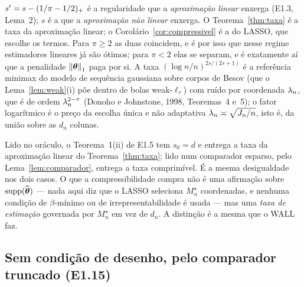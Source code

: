 \documentclass[11pt,a4paper]{article}
\newcommand{\Mstar}{M^{\star}}
\begin{document}
\begin{remark}\label{rem:tres}
$s' = s - (1/\pi - 1/2)_{+}$ é a regularidade que a \emph{aproximação
linear} enxerga (E1.3, Lema~2); $s$ é a que a \emph{aproximação não linear}
enxerga. O Teorema~\ref{thm:taxa} é a taxa da aproximação linear; o
Corolário~\ref{cor:compressivel} é a do LASSO, que escolhe os termos. Para $\pi \ge 2$ as duas coincidem, e é
por isso que nesse regime estimadores lineares já são ótimos; para $\pi < 2$
elas se separam, e é exatamente aí que a penalidade $\left\lVert \boldsymbol{\theta} \right\rVert_{1}$ paga
por si. A taxa $(\log n/n)^{2s/(2s+1)}$ é a referência minimax do modelo de
sequência gaussiana sobre corpos de Besov (que o Lema~\ref{lem:weak}(i) põe
dentro de bolas weak-$\ell_{\tau}$) com ruído por coordenada $\lambda_{n}$, que é
de ordem $\lambda_{n}^{2-\tau}$ (Donoho e Johnstone, 1998, Teoremas~4 e~5);
o fator logarítmico é o preço da escolha única e não adaptativa
$\lambda_{n} \asymp \sqrt{J_{n}/n}$, isto é, da união sobre as $d_{n}$ colunas.
\end{remark}

\begin{remark}[por que $s_{0} = d$ não é um defeito do Teorema~1]\label{rem:s0}
Lido no oráculo, o Teorema~1(ii) de E1.5 tem $s_{0} = d$ e entrega a taxa da
aproximação linear do Teorema~\ref{thm:taxa}; lido num comparador esparso,
pelo Lema~\ref{lem:comparador}, entrega a taxa comprimível. É a mesma desigualdade
nos dois casos. O que a compressibilidade compra não é uma afirmação sobre
$\operatorname{supp}(\widehat{\boldsymbol{\theta}})$ --- nada aqui diz que o LASSO seleciona
$\Mstar_{n}$ coordenadas, e nenhuma condição de $\beta$-mínimo ou de
irrepresentabilidade é usada --- mas uma \emph{taxa de estimação} governada
por $\Mstar_{n}$ em vez de $d_{n}$. A distinção é a mesma que o WALL faz.
\end{remark}

\subsection*{Sem condição de desenho, pelo comparador truncado (E1.15)}
\end{document}
